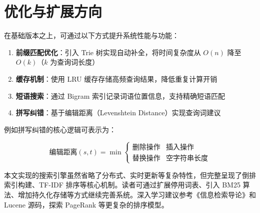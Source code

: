 \chapter{优化与扩展方向}
在基础版本之上，可通过以下方式提升系统性能与功能：\par
\begin{enumerate}
\item \textbf{前缀匹配优化}：引入 Trie 树实现自动补全，将时间复杂度从 $O(n)$ 降至 $O(k)$（$k$ 为查询词长度）
\item \textbf{缓存机制}：使用 LRU 缓存存储高频查询结果，降低重复计算开销
\item \textbf{短语搜索}：通过 Bigram 索引记录词语位置信息，支持精确短语匹配
\item \textbf{拼写纠错}：基于编辑距离（Levenshtein Distance）实现查询词建议
\end{enumerate}
例如拼写纠错的核心逻辑可表示为：\par
$$ \text{编辑距离}(s, t) = \min \begin{cases} \text{删除操作} & \text{插入操作} \\ \text{替换操作} & \text{空字符串长度} \end{cases} $$\par
本文实现的搜索引擎虽然省略了分布式、实时更新等复杂特性，但完整呈现了倒排索引构建、TF-IDF 排序等核心机制。读者可通过扩展停用词表、引入 BM25 算法、增加持久化存储等方式继续完善系统。深入学习建议参考《信息检索导论》和 Lucene 源码，探索 PageRank 等更复杂的排序模型。\par
